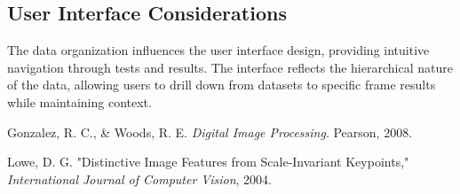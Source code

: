 \subsection{User Interface Considerations}
The data organization influences the user interface design, providing intuitive navigation through tests and results. The interface reflects the hierarchical nature of the data, allowing users to drill down from datasets to specific frame results while maintaining context.


\begin{thebibliography}{9}

    Gonzalez, R. C., \& Woods, R. E. \textit{Digital Image Processing}. Pearson, 2008.
    
    Lowe, D. G. "Distinctive Image Features from Scale-Invariant Keypoints," \textit{International Journal of Computer Vision}, 2004.
    
    \end{thebibliography}